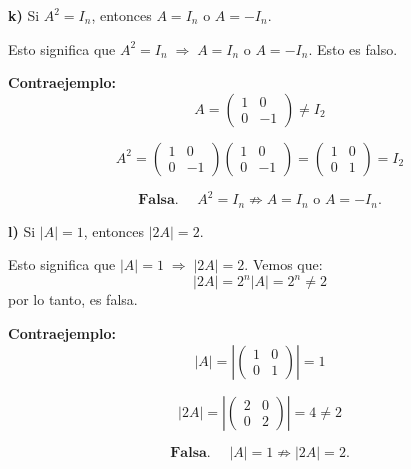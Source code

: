 \documentclass[a4paper,12pt]{article}
\begin{document}
\begin{ejercicio}[title=Ejercicio 42 (⋆)]
\textbf{k)} Si $A^2 = I_n$, entonces $A = I_n$ o $A = -I_n$.

\vspace{0.5em}

Esto significa que $A^2 = I_n \;\Rightarrow\; A = I_n \text{ o } A = -I_n$.  
Esto es falso.

\vspace{0.5em}

\textbf{Contraejemplo:}
\[
A = \begin{pmatrix}1 & 0 \\ 0 & -1\end{pmatrix} \neq I_2
\]

\[
A^2 =
\begin{pmatrix}1 & 0 \\ 0 & -1\end{pmatrix}
\begin{pmatrix}1 & 0 \\ 0 & -1\end{pmatrix}
=
\begin{pmatrix}1 & 0 \\ 0 & 1\end{pmatrix}
= I_2
\]

\[
\boxed{\textbf{Falsa. }\quad A^2 = I_n \not\Rightarrow A = I_n \text{ o } A = -I_n.}
\]

\vspace{1em}

\textbf{l)} Si $|A| = 1$, entonces $|2A| = 2$.

\vspace{0.5em}

Esto significa que $|A| = 1 \;\Rightarrow\; |2A| = 2$.  
Vemos que:
\[
|2A| = 2^n |A| = 2^n \neq 2
\]
por lo tanto, es falsa.

\vspace{0.5em}

\textbf{Contraejemplo:}
\[
|A| = \left|\begin{pmatrix}1 & 0 \\ 0 & 1\end{pmatrix}\right| = 1
\]

\[
|2A| = \left|\begin{pmatrix}2 & 0 \\ 0 & 2\end{pmatrix}\right| = 4 \neq 2
\]

\[
\boxed{\textbf{Falsa. }\quad |A| = 1 \not\Rightarrow |2A| = 2.}
\]
\end{ejercicio}
\end{document}
